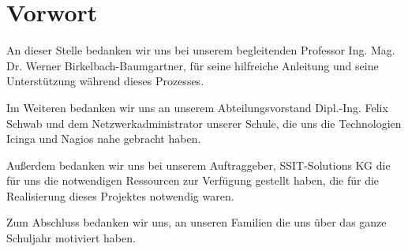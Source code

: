 \chapter{Vorwort}

An dieser Stelle bedanken wir uns bei unserem begleitenden Professor Ing. Mag. Dr. Werner Birkelbach-Baumgartner,
für seine hilfreiche Anleitung und seine Unterstützung während dieses Prozesses.                  

\SuperPar Im Weiteren bedanken wir uns an unserem Abteilungsvorstand Dipl.-Ing. Felix Schwab und dem Netzwerkadministrator unserer Schule,
die uns die Technologien Icinga und Nagios nahe gebracht haben.                 

\SuperPar Außerdem bedanken wir uns bei unserem Auftraggeber, SSIT-Solutions KG die für uns die notwendigen Ressourcen zur Verfügung gestellt haben,
die für die Realisierung dieses Projektes notwendig waren.                     

\SuperPar Zum Abschluss bedanken wir uns, an unseren Familien die uns über das ganze Schuljahr motiviert haben.






